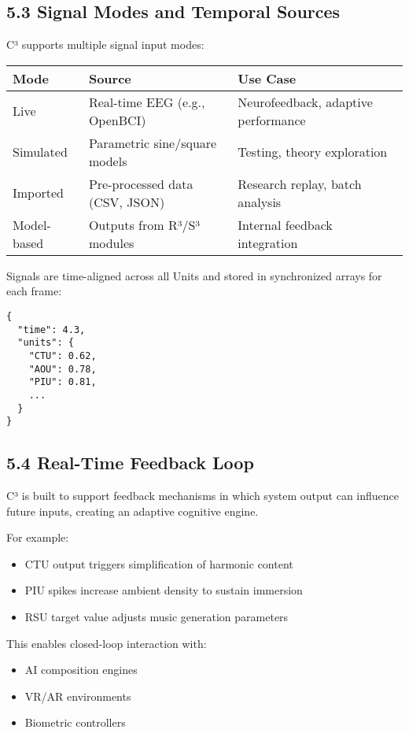 \documentclass[10pt]{article}
\begin{document}
\subsection*{5.3 Signal Modes and Temporal Sources}

C³ supports multiple signal input modes:

\begin{center}
\begin{tabular}{|l|l|p{6.5cm}|}
\hline
\textbf{Mode} & \textbf{Source} & \textbf{Use Case} \\
\hline
Live & Real-time EEG (e.g., OpenBCI) & Neurofeedback, adaptive performance \\
Simulated & Parametric sine/square models & Testing, theory exploration \\
Imported & Pre-processed data (CSV, JSON) & Research replay, batch analysis \\
Model-based & Outputs from R³/S³ modules & Internal feedback integration \\
\hline
\end{tabular}
\end{center}

Signals are time-aligned across all Units and stored in synchronized arrays for each frame:

\begin{verbatim}
{
  "time": 4.3,
  "units": {
    "CTU": 0.62,
    "AOU": 0.78,
    "PIU": 0.81,
    ...
  }
}
\end{verbatim}

\subsection*{5.4 Real-Time Feedback Loop}

C³ is built to support feedback mechanisms in which system output can influence future inputs, creating an adaptive cognitive engine.

For example:

\begin{itemize}
    \item CTU output triggers simplification of harmonic content
    \item PIU spikes increase ambient density to sustain immersion
    \item RSU target value adjusts music generation parameters
\end{itemize}

This enables closed-loop interaction with:

\begin{itemize}
    \item AI composition engines
    \item VR/AR environments
    \item Biometric controllers
\end{itemize}
\end{document}
